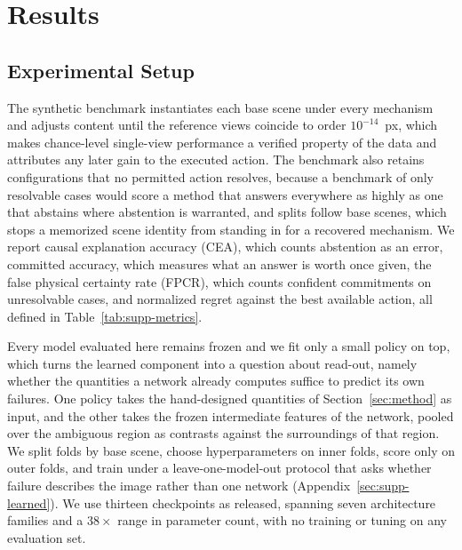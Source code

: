 \documentclass{article} %
\theoremstyle{defstyle}
\theoremstyle{plain}
\begin{document}
\section{Results}
\label{sec:results}

\subsection{Experimental Setup}
\label{sec:setup}

The synthetic benchmark instantiates each base scene under every mechanism and adjusts
content until the reference views coincide to order $10^{-14}$~px, which makes chance-level
single-view performance a verified property of the data and attributes any later gain to the
executed action. The benchmark also retains configurations that no permitted action
resolves, because a benchmark of only resolvable cases would score a method that answers
everywhere as highly as one that abstains where abstention is warranted, and splits follow
base scenes, which stops a memorized scene identity from standing in for a recovered
mechanism. We report causal explanation accuracy (CEA), which counts abstention as an error,
committed accuracy, which measures what an answer is worth once given, the false physical
certainty rate (FPCR), which counts confident commitments on unresolvable cases, and
normalized regret against the best available action, all defined in
Table~\ref{tab:supp-metrics}.

Every model evaluated here remains frozen and we fit only a small policy on top, which turns
the learned component into a question about read-out, namely whether the quantities a
network already computes suffice to predict its own failures. One policy takes the
hand-designed quantities of Section~\ref{sec:method} as input, and the other takes the
frozen intermediate features of the network, pooled over the ambiguous region as contrasts
against the surroundings of that region. We split folds by base scene, choose
hyperparameters on inner folds, score only on outer folds, and train under a
leave-one-model-out protocol that asks whether failure describes the image rather than one
network (Appendix~\ref{sec:supp-learned}). We use thirteen checkpoints as released, spanning
seven architecture families and a $38\times$ range in parameter count, with no training or
tuning on any evaluation set.
\end{document}
